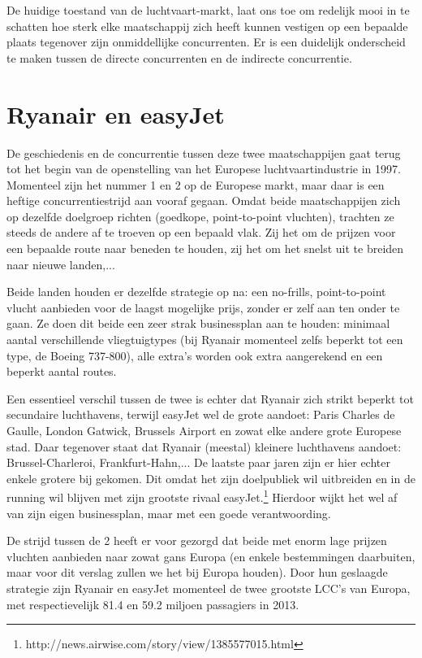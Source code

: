 \documentclass{article}
\begin{document}
De huidige toestand van de luchtvaart-markt, laat ons toe om redelijk mooi in te schatten hoe sterk elke maatschappij zich heeft kunnen vestigen op een bepaalde plaats tegenover zijn onmiddellijke concurrenten.
Er is een duidelijk onderscheid te maken tussen de directe concurrenten en de indirecte concurrentie.

\section{Ryanair en easyJet}

De geschiedenis en de concurrentie tussen deze twee maatschappijen gaat terug tot het begin van de openstelling van het Europese luchtvaartindustrie in 1997. Momenteel zijn het nummer 1 en 2 op de Europese markt, maar daar is een heftige concurrentiestrijd aan vooraf gegaan. Omdat beide maatschappijen zich op dezelfde doelgroep richten (goedkope, point-to-point vluchten), trachten ze steeds de andere af te troeven op een bepaald vlak. Zij het om de prijzen voor een bepaalde route naar beneden te houden, zij het om het snelst uit te breiden naar nieuwe landen,...

Beide landen houden er dezelfde strategie op na: een no-frills, point-to-point vlucht aanbieden voor de laagst mogelijke prijs, zonder er zelf aan ten onder te gaan. Ze doen dit beide een zeer strak businessplan aan te houden: minimaal aantal verschillende vliegtuigtypes (bij Ryanair momenteel zelfs beperkt tot een type, de Boeing 737-800), alle extra's worden ook extra aangerekend en een beperkt aantal routes.

Een essentieel verschil tussen de twee is echter dat Ryanair zich strikt beperkt tot secundaire luchthavens, terwijl easyJet wel de grote aandoet: Paris Charles de Gaulle, London Gatwick, Brussels Airport en zowat elke andere grote Europese stad. Daar tegenover staat dat Ryanair (meestal) kleinere luchthavens aandoet: Brussel-Charleroi, Frankfurt-Hahn,... De laatste paar jaren zijn er hier echter enkele grotere bij gekomen. Dit omdat het zijn doelpubliek wil uitbreiden en in de running wil blijven met zijn grootste rivaal easyJet.\footnote{http://news.airwise.com/story/view/1385577015.html} Hierdoor wijkt het wel af van zijn eigen businessplan, maar met een goede verantwoording.

De strijd tussen de 2 heeft er voor gezorgd dat beide met enorm lage prijzen vluchten aanbieden naar zowat gans Europa (en enkele bestemmingen daarbuiten, maar voor dit verslag zullen we het bij Europa houden). Door hun geslaagde strategie zijn Ryanair en easyJet momenteel de twee grootste LCC's van Europa, met respectievelijk 81.4 en 59.2 miljoen passagiers in 2013.
\end{document}
